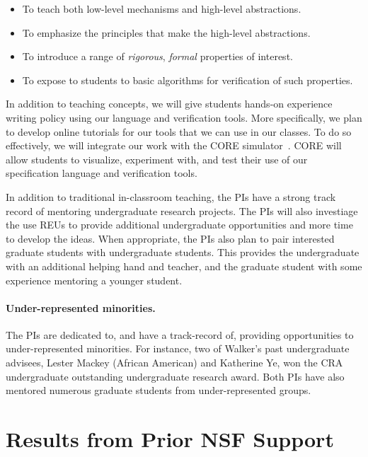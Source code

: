 \begin{itemize}
\item To teach both low-level mechanisms and high-level abstractions.
\item To emphasize the principles that make the high-level abstractions.
\item To introduce a range of \emph{rigorous}, \emph{formal} properties of
 interest.
\item To expose to students to basic algorithms for verification of such
properties.
\end{itemize}

In addition to teaching concepts, we will give students hands-on
experience writing policy using our language and verification tools.  
More specifically, we plan to develop online tutorials for our tools
that we can use in our classes.  To do so effectively, we will
integrate our work with the CORE simulator~\cite{core}.  CORE
will allow students to visualize, experiment with, and test their
use of our specification language and verification tools.

In addition to traditional in-classroom teaching, the PIs have a strong 
track record of mentoring
undergraduate research projects.
The PIs will also
investiage the use REUs to provide additional undergraduate opportunities
and more time to develop the ideas.
When appropriate, 
the PIs also plan to pair interested graduate students with undergraduate 
students.  This provides the undergraduate with
an additional helping hand and teacher, and the graduate student with
some experience mentoring a younger student.  

\paragraph*{Under-represented minorities.} The PIs are dedicated
to, and have a track-record of, providing opportunities to under-represented 
minorities.  For instance, two of Walker's past undergraduate advisees,
Lester Mackey (African American) and Katherine Ye, won the CRA undergraduate 
outstanding undergraduate
research award.  Both PIs have also mentored numerous graduate students from 
under-represented groups.

\section{Results from Prior NSF Support}
\label{sec:prior-support}

